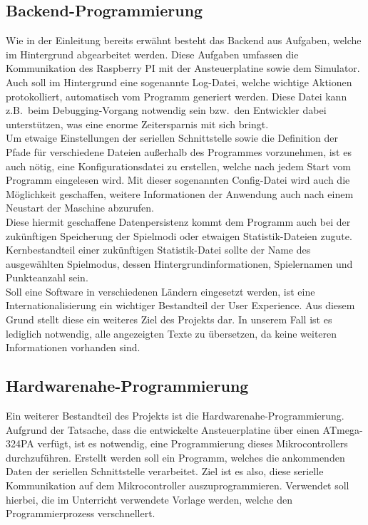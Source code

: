 \subsection{Backend-Programmierung}\label{subsec:backend-programmierung}
Wie in der Einleitung bereits erwähnt besteht das Backend aus Aufgaben, welche im Hintergrund abgearbeitet werden.
Diese Aufgaben umfassen die Kommunikation des Raspberry PI mit der Ansteuerplatine sowie dem Simulator.\\
Auch soll im Hintergrund eine sogenannte Log-Datei, welche wichtige Aktionen protokolliert, automatisch vom Programm generiert werden.
Diese Datei kann z.B.\ beim Debugging-Vorgang notwendig sein bzw.\ den Entwickler dabei unterstützen, was eine enorme Zeitersparnis mit sich bringt.\\
Um etwaige Einstellungen der seriellen Schnittstelle sowie die Definition der Pfade für verschiedene Dateien außerhalb des Programmes vorzunehmen, ist es auch nötig, eine Konfigurationsdatei zu erstellen, welche nach jedem Start vom Programm eingelesen wird.
Mit dieser sogenannten Config-Datei wird auch die Möglichkeit geschaffen, weitere Informationen der Anwendung auch nach einem Neustart der Maschine abzurufen.\\
Diese hiermit geschaffene Datenpersistenz kommt dem Programm auch bei der zukünftigen Speicherung der Spielmodi oder etwaigen Statistik-Dateien zugute.
Kernbestandteil einer zukünftigen Statistik-Datei sollte der Name des ausgewählten Spielmodus, dessen Hintergrundinformationen, Spielernamen und Punkteanzahl sein.\\
Soll eine Software in verschiedenen Ländern eingesetzt werden, ist eine Internationalisierung ein wichtiger Bestandteil der User Experience.
Aus diesem Grund stellt diese ein weiteres Ziel des Projekts dar.
In unserem Fall ist es lediglich notwendig, alle angezeigten Texte zu übersetzen, da keine weiteren Informationen vorhanden sind.

\subsection{Hardwarenahe-Programmierung}\label{subsec:hardwarenahe-programmierung}
Ein weiterer Bestandteil des Projekts ist die Hardwarenahe-Programmierung.
Aufgrund der Tatsache, dass die entwickelte Ansteuerplatine über einen ATmega-324PA verfügt, ist es notwendig, eine Programmierung dieses Mikrocontrollers durchzuführen.
Erstellt werden soll ein Programm, welches die ankommenden Daten der seriellen Schnittstelle verarbeitet.
Ziel ist es also, diese serielle Kommunikation auf dem Mikrocontroller auszuprogrammieren.
Verwendet soll hierbei, die im Unterricht verwendete Vorlage werden, welche den Programmierprozess verschnellert.

